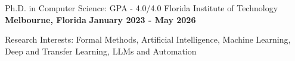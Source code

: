


\begin{cventries}

\cventry
{Ph.D. in Computer Science: GPA - 4.0/4.0}
{Florida Institute of Technology}
{\textbf{Melbourne, Florida}}
{\textbf{January 2023 - May 2026}}
{
\begin{cvitems}
\item {Research Interests: Formal Methods, Artificial Intelligence, Machine Learning, Deep and Transfer Learning, LLMs and Automation}

\end{cvitems}}
\end{cventries}
